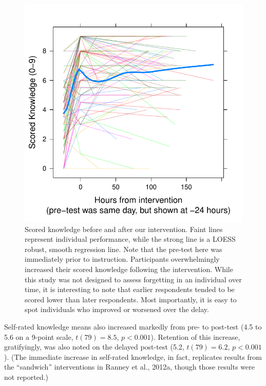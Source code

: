 \begin{figure}
    \centering
    \includegraphics{RPP-mech-scored.pdf}
    \caption{Scored knowledge before and after our intervention. Faint lines
        represent individual performance, while the strong line is a LOESS
        robust, smooth regression line. Note that the pre-test here was
        immediately prior to instruction. Participants overwhelmingly increased
        their scored knowledge following the intervention. While this study was
        not designed to assess forgetting in an individual over time, it is
        interesting to note that earlier respondents tended to be scored lower
        than later respondents. Most importantly, it is easy to spot individuals
        who improved or worsened over the delay.}
\end{figure}

Self-rated knowledge means also increased markedly from pre- to post-test (4.5
to 5.6 on a 9-point scale, $t(79)=8.5$, $p<0.001$). Retention of this increase,
gratifyingly, was also noted on the delayed post-test (5.2, $t(79)=6.2$,
$p<0.001$). (The immediate increase in self-rated knowledge, in fact, replicates
results from the ``sandwich'' interventions in Ranney et al., 2012a, though
those results were not reported.)

